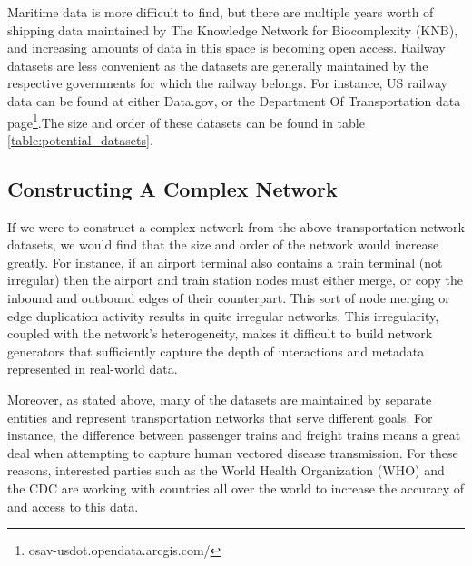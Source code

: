 Maritime data is more difficult to find, but there are multiple years worth of shipping data maintained by The Knowledge Network for Biocomplexity (KNB)\cite{knb_data}, and increasing amounts of data in this space is becoming open access. Railway datasets are less convenient as the datasets are generally maintained by the respective governments for which the railway belongs. For instance, US railway data can be found at either Data.gov, or the Department Of Transportation data page\footnote{osav-usdot.opendata.arcgis.com/}.The size and order of these datasets can be found in table \ref{table:potential_datasets}.

\subsection{Constructing A Complex Network}

If we were to construct a complex network from the above transportation network datasets, we would find that the size and order of the network would increase greatly. For instance, if an airport terminal also contains a train terminal (not irregular) then the airport and train station nodes must either merge, or copy the inbound and outbound edges of their counterpart. This sort of node merging or edge duplication activity results in quite irregular networks. This irregularity, coupled with the network's heterogeneity, makes it difficult to build network generators that sufficiently capture the depth of interactions and metadata represented in real-world data.

Moreover, as stated above, many of the datasets are maintained by separate entities and represent transportation networks that serve different goals. For instance, the difference between passenger trains and freight trains means a great deal when attempting to capture human vectored disease transmission. For these reasons, interested parties such as the World Health Organization (WHO) and the CDC are working with countries all over the world to increase the accuracy of and access to this data.
